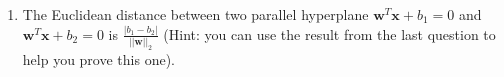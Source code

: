 \documentclass[letter]{article}
\theoremstyle{definition}
\begin{document}
\begin{enumerate}
                    
            
            
		
		\item 	The Euclidean distance between two parallel hyperplane $\mathbf{w}^{T}\mathbf{x} + b_1 = 0$ and $\mathbf{w}^{T}\mathbf{x} + b_2 = 0$ is $\frac{|b_1 - b_2|}{||\mathbf{w}||_2}$ (Hint: you can use the result from the last question to help you prove this one).


\end{enumerate}
\end{document}
